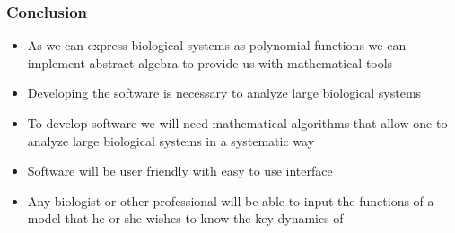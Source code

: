 \documentclass{beamer}
\begin{document}
\begin{frame}
\frametitle{Conclusion}

	\begin{itemize}
		\item{As we can express biological systems as polynomial functions we can implement abstract algebra to provide us 				with mathematical tools}
		\item{Developing the software is necessary to analyze large biological systems}	
		\item{To develop software we will need mathematical algorithms that allow one to analyze large biological systems in a 			systematic way} 
		\item{Software will be user friendly with easy to use interface}
		\item{Any biologist or other professional will be able to input the functions of a model that he or she wishes to know 			the key dynamics of}
	\end{itemize}
\end{frame}
\end{document}
